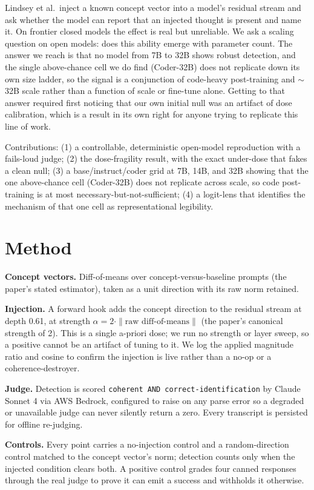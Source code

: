 \documentclass[11pt]{article}
\begin{document}
Lindsey et al.\ inject a known concept vector into a model's residual stream and ask whether the model can report that an injected thought is present and name it. On frontier closed models the effect is real but unreliable. We ask a scaling question on open models: does this ability emerge with parameter count. The answer we reach is that no model from 7B to 32B shows robust detection, and the single above-chance cell we do find (Coder-32B) does not replicate down its own size ladder, so the signal is a conjunction of code-heavy post-training and $\sim$32B scale rather than a function of scale or fine-tune alone. Getting to that answer required first noticing that our own initial null was an artifact of dose calibration, which is a result in its own right for anyone trying to replicate this line of work.

Contributions: (1) a controllable, deterministic open-model reproduction with a fails-loud judge; (2) the dose-fragility result, with the exact under-dose that fakes a clean null; (3) a base/instruct/coder grid at 7B, 14B, and 32B showing that the one above-chance cell (Coder-32B) does not replicate across scale, so code post-training is at most necessary-but-not-sufficient; (4) a logit-lens that identifies the mechanism of that one cell as representational legibility.

\section{Method}

\textbf{Concept vectors.} Diff-of-means over concept-versus-baseline prompts (the paper's stated estimator), taken as a unit direction with its raw norm retained.

\textbf{Injection.} A forward hook adds the concept direction to the residual stream at depth 0.61, at strength $\alpha = 2 \cdot \|\text{raw diff-of-means}\|$ (the paper's canonical strength of 2). This is a single a-priori dose; we run no strength or layer sweep, so a positive cannot be an artifact of tuning to it. We log the applied magnitude ratio and cosine to confirm the injection is live rather than a no-op or a coherence-destroyer.

\textbf{Judge.} Detection is scored \texttt{coherent AND correct-identification} by Claude Sonnet 4 via AWS Bedrock, configured to raise on any parse error so a degraded or unavailable judge can never silently return a zero. Every transcript is persisted for offline re-judging.

\textbf{Controls.} Every point carries a no-injection control and a random-direction control matched to the concept vector's norm; detection counts only when the injected condition clears both. A positive control grades four canned responses through the real judge to prove it can emit a success and withholds it otherwise.
\end{document}
